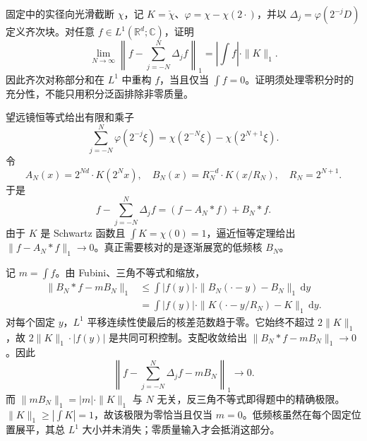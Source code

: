 \begin{exercise}\label{b2:ex:19-new-6}
固定中的实径向光滑截断 \(\chi\)，记 \(K=\check\chi\)、\(\varphi=\chi-\chi(2\cdot)\)，并以 \(\Delta_j=\varphi(2^{-j}D)\) 定义齐次块。对任意 \(f\in L^1(\mathbb R^d;\mathbb C)\)，证明
\[
 \lim_{N\to\infty}
 \left\|f-\sum_{j=-N}^{N}\Delta_jf\right\|_1
 =\left|\int f\right|\cdot\|K\|_1.
\]
因此齐次对称部分和在 \(L^1\) 中重构 \(f\)，当且仅当 \(\int f=0\)。证明须处理零积分时的充分性，不能只用积分泛函排除非零质量。
\end{exercise}
\begin{solution}
望远镜恒等式给出有限和乘子
\[
 \sum_{j=-N}^N\varphi(2^{-j}\xi)
 =\chi(2^{-N}\xi)-\chi(2^{N+1}\xi).
\]
令
\[
 A_N(x)=2^{Nd}\cdot K(2^Nx),\quad
 B_N(x)=R_N^{-d}\cdot K(x/R_N),\quad R_N=2^{N+1}.
\]
于是
\[
 f-\sum_{j=-N}^N\Delta_jf=(f-A_N*f)+B_N*f.
\]
由于 \(K\) 是 Schwartz 函数且 \(\int K=\chi(0)=1\)，逼近恒等定理给出 \(\|f-A_N*f\|_1\to0\)。真正需要核对的是逐渐展宽的低频核 \(B_N\)。

记 \(m=\int f\)。由 Fubini、三角不等式和缩放，
\[
 \begin{aligned}
 \|B_N*f-mB_N\|_1
 &\leq\int |f(y)|\cdot
             \|B_N(\cdot-y)-B_N\|_1\,\mathrm dy\\
 &=\int |f(y)|\cdot
             \|K(\cdot-y/R_N)-K\|_1\,\mathrm dy.
 \end{aligned}
\]
对每个固定 \(y\)，\(L^1\) 平移连续性使最后的核差范数趋于零。它始终不超过 \(2\|K\|_1\)，故 \(2\|K\|_1\cdot|f(y)|\) 是共同可积控制。支配收敛给出
\(\|B_N*f-mB_N\|_1\to0\)。因此
\[
 \left\|f-\sum_{j=-N}^N\Delta_jf-mB_N\right\|_1
 \longrightarrow0.
\]
而 \(\|mB_N\|_1=|m|\cdot\|K\|_1\) 与 \(N\) 无关，反三角不等式即得题中的精确极限。\(\|K\|_1\geq|\int K|=1\)，故该极限为零恰当且仅当 \(m=0\)。低频核虽然在每个固定位置展平，其总 \(L^1\) 大小并未消失；零质量输入才会抵消这部分。
\end{solution}

